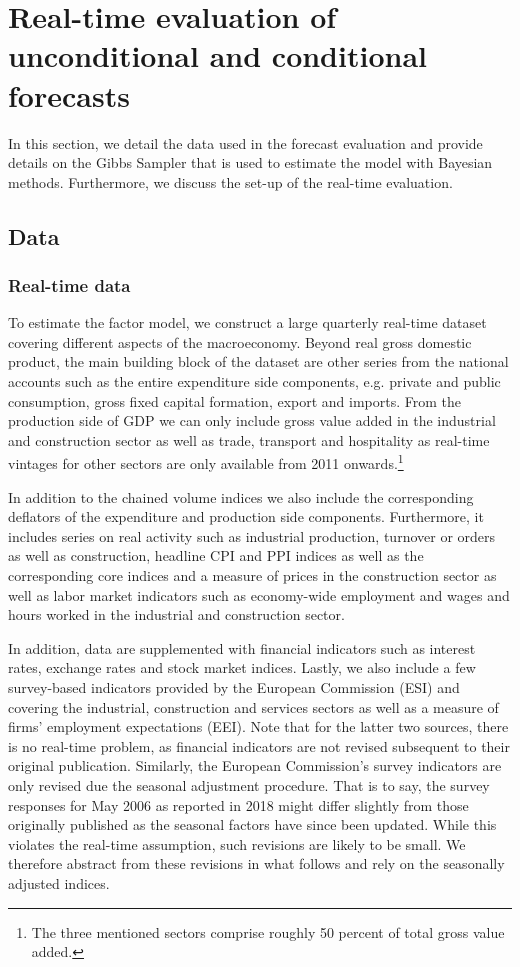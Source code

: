 \documentclass[notitlepage,a4paper,12pt]{article}
\begin{document}
\section{Real-time evaluation of unconditional and conditional forecasts}

In this section, we detail the data used in the forecast evaluation and provide details on the Gibbs Sampler that is used to estimate the model with Bayesian methods. Furthermore, we discuss the set-up of the real-time evaluation. 

\subsection{Data}
\subsubsection{Real-time data}

To estimate the factor model, we construct a large quarterly real-time dataset covering different aspects of the macroeconomy. Beyond real gross domestic product, the main building block of the dataset are other series from the national accounts such as the entire expenditure side components, e.g. private and public consumption, gross fixed capital formation, export and imports. From the production side of GDP we can only include gross value added in the industrial and construction sector as well as trade, transport and hospitality as real-time vintages for other sectors are only available from 2011 onwards.\footnote{The three mentioned sectors comprise roughly 50 percent of total gross value added.} 

In addition to the chained volume indices we also include the corresponding deflators of the expenditure and production side components. Furthermore, it includes series on real activity such as industrial production, turnover or orders as well as construction, headline CPI and PPI indices as well as the corresponding core indices and a measure of prices in the construction sector as well as labor market indicators such as economy-wide employment and wages and hours worked in the industrial and construction sector.    

In addition, data are supplemented with financial indicators such as interest rates, exchange rates and stock market indices. Lastly, we also include a few survey-based indicators provided by the European Commission (ESI) and covering the industrial, construction and services sectors as well as a measure of firms' employment expectations (EEI). Note that for the latter two sources, there is no real-time problem, as financial indicators are not revised subsequent to their original publication. Similarly, the European Commission's survey indicators are only revised due the seasonal adjustment procedure. That is to say, the survey responses for May 2006 as reported in 2018 might differ slightly from those originally published as the seasonal factors have since been updated. While this violates the real-time assumption, such revisions are likely to be small. We therefore abstract from these revisions in what follows  and rely on the seasonally adjusted indices.
\end{document}
